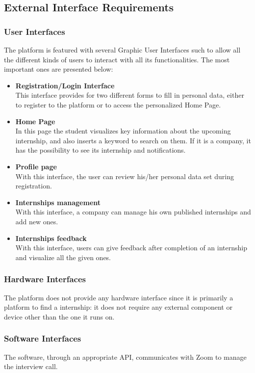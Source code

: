 \subsection{External Interface Requirements}
\subsubsection{User Interfaces}

The platform is featured with several Graphic User Interfaces such to allow all the different kinds of users to interact with all its functionalities. The most important ones are presented below: 
\begin{itemize}
    \item \textbf{Registration/Login Interface}\\
    This interface provides for two different forms to fill in personal data, either to register to the platform or to access the personalized Home Page. 
    \item \textbf{Home Page}\\
    In this page the student visualizes key information about the upcoming internship, and also inserts a keyword to search on them. If it is a company, it has the possibility to see its internship and notifications.
    \item \textbf{Profile page}\\
    With this interface, the user can review his/her personal data set during registration. 
    \item \textbf{Internships management}\\
    With this interface, a company can manage his own published internships and add new ones.
    \item \textbf{Internships feedback}\\
    With this interface, users can give feedback after completion of an internship and visualize all the given ones.
\end{itemize}
\subsubsection{Hardware Interfaces}
The platform does not provide any hardware interface since it is primarily a platform to find a internship: it does not require any external component or device other than the one it runs
on. 
\subsubsection{Software Interfaces}
The software, through an appropriate API, communicates with Zoom to manage the interview call. 

